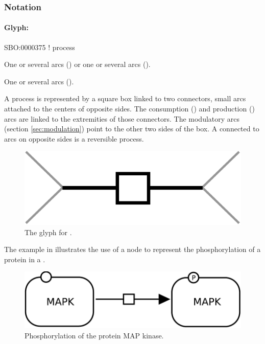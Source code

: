 \subsubsection{Notation}

\paragraph{Glyph: }
\label{sec:process}

\begin{glyphDescription}

\glyphSboTerm SBO:0000375 ! process

\glyphOrigin One or several  arcs () or one or several  arcs ().

\glyphTarget One or several  arcs ().

\glyphNode A process is represented by a square box linked to two
connectors, small arcs attached to the centers of opposite sides. The
consumption () and production ()
arcs are linked to the extremities of those connectors. The modulatory
arcs (section \ref{sec:modulation}) point to the other two sides of the box. A  connected to  arcs on opposite sides is a reversible process. 

\end{glyphDescription}

\begin{figure}[H]
  \centering
  \includegraphics[scale = 0.4]{images/process}
  \caption{The \PD glyph for .}
  \label{fig:process}
\end{figure}


The example in  illustrates the use of a  node to represent the phosphorylation of a protein in a \PD.

\begin{figure}[H]
  \centering
  \includegraphics[scale = 0.3]{examples/process-phosphorylation}
  \caption{Phosphorylation of the protein MAP kinase.}
  \label{fig:trans-phos}
\end{figure}

